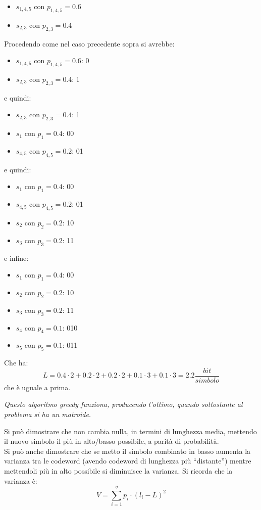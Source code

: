 \documentclass[a4paper,12pt, oneside]{book}
\begin{document}
\begin{esempio}
  \begin{itemize}
    \item $s_{1,4,5}$ con $p_{1,4,5}=0.6$
    \item $s_{2,3}$ con $p_{2,3}=0.4$
  \end{itemize}
  Procedendo come nel caso precedente sopra si avrebbe: 
   \begin{itemize}
    \item $s_{1,4,5}$ con $p_{1,4,5}=0.6$: 0
    \item $s_{2,3}$ con $p_{2,3}=0.4$: 1
  \end{itemize}
  e quindi:
  \begin{itemize}
    \item $s_{2,3}$ con $p_{2,3}=0.4$: 1
    \item $s_1$ con $p_1=0.4$: 00
    \item $s_{4,5}$ con $p_{4,5}=0.2$: 01
  \end{itemize}
  e quindi:
  \begin{itemize}
    \item $s_1$ con $p_1=0.4$: 00
    \item $s_{4,5}$ con $p_{4,5}=0.2$: 01
    \item $s_2$ con $p_2=0.2$: 10
    \item $s_3$ con $p_3=0.2$: 11
  \end{itemize}
  e infine:
  \begin{itemize}
    \item $s_1$ con $p_1=0.4$: 00
    \item $s_2$ con $p_2=0.2$: 10
    \item $s_3$ con $p_3=0.2$: 11
    \item $s_4$ con $p_4=0.1$: 010
    \item $s_5$ con $p_5=0.1$: 011
  \end{itemize}
  Che ha:
  \[L=0.4\cdot 2+0.2\cdot 2+0.2\cdot 2+0.1\cdot 3+0.1\cdot 3 =
    2.2\frac{bit}{simbolo}\]
  che è uguale a prima.
\end{esempio}
\textit{Questo algoritmo greedy funziona, producendo l'ottimo, quando
  sottostante al problema si ha un matroide.}
\begin{teorema}
  Si può dimostrare che non cambia nulla, in termini di lunghezza media,
  mettendo il nuovo simbolo il più in alto/basso possibile, a parità di
  probabilità.\\
  Si può anche
  dimostrare che se metto il simbolo combinato in basso aumenta la varianza tra
  le codeword (avendo codeword di lunghezza più ``distante'') mentre mettendoli
  più in alto possibile si diminuisce la varianza. Si ricorda che la varianza è:
  \[V=\sum_{i=1}^q p_i\cdot (l_i-L)^2\]
\end{teorema}
\end{document}
